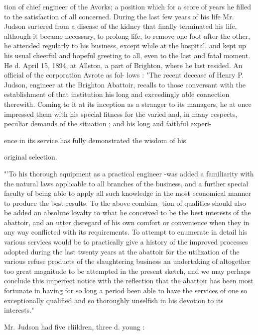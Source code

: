 \documentclass{book}
\begin{document}
tion of chief engineer of the Avorks; a position which for a 
score of years he filled to the satisfaction of all concerned. 
During the last few years of his life Mr. Judson surtered from 
a disease of the kidney that finally terminated his life, 
although it became necessary, to prolong life, to remove 
one foot after the other, he attended regularly to his business, 
except while at the hospital, and kept up his usual cheerful 
and hopeful greeting to all, even to the last and fatal moment. 
He d. April 15, 1894, at Allston, a part of Brighton, where 
he last resided. An official of the corporation Avrote as fol- 
lows : "The recent decease of Henry P. Judson, engineer 
at the Brighton Abattoir, recalls to those conversant with the 
establishment of that institution his long and exceedingly 
able connection therewith. Coming to it at its inception as a 
stranger to its managers, he at once impressed them with his 
special fitness for the varied and, in many respects, peculiar 
demands of the situation ; and his long and faithful experi- 




 ence in its service has fully demonstrated the wisdom of his 

original selection. 

"'To his thorough equipment as a practical engineer -was 
added a familiarity with the natural laws applicable to all 
branches of the business, and a further special faculty of 
being able to apply all such knowledge in the most economical 
manner to produce the best results. To the above combina- 
tion of qualities should also be added an absolute loyalty to 
what he conceived to be the best interests of the abattoir, 
and an utter disregard of his own comfort or convenience 
when they in any way conflicted with its requirements. To 
attempt to enumerate in detail his various services would be 
to practically give a history of the improved processes 
adopted during the last twenty years at the abattoir for the 
utilization of the various refuse products of the slaughtering 
business  an undertaking of altogether too great magnitude 
to be attempted in the present sketch, and we may perhaps 
conclude this imperfect notice with the reflection that the 
abattoir has been most fortunate in having for so long a 
period been able to have the services of one so exceptionally 
qualified and so thoroughly unselfish in his devotion to its 
interests." 

Mr. Judson had five cliildren, three d. young : 
\end{document}
